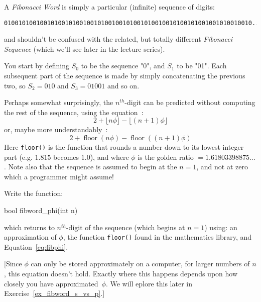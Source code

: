 \label{sec:fibword_phi}


A {\em Fibonacci Word} is simply a particular (infinite) sequence of digits:
\begin{verbatim}
010010100100101001010010010100100101001010010010100101001001010010010...
\end{verbatim}
and shouldn't be confused with the related, but totally different {\em Fibonacci Sequence} (which we'll see later in the lecture series).

You start by defining $S_0$ to be the sequence "0", and $S_1$ to be 
"01". Each subsequent part of the sequence is made by simply concatenating
the previous two, so $S_2 = 010$ and $S_3 = 01001$ and so on.

Perhaps somewhat surprisingly, the $n^{th}$-digit can be
predicted without computing the rest of the sequence, using the equation~:
\begin{equation}
\label{eq:fibphi_math}
2 + \lfloor n \phi \rfloor - \lfloor (n+1) \phi \rfloor
\end{equation}
or, maybe more understandably~:
\begin{equation}
\label{eq:fibphi}
2 + \operatorname{floor}(n \phi) - \operatorname{floor}((n+1) \phi)
\end{equation}
Here \verb^floor()^ is the function that
rounds a number down to its lowest integer part (e.g. $1.815$ becomes
$1.0$), and where $\phi$ is the golden ratio $=1.61803398875...$.
Note also that the sequence is assumed to begin at the $n=1$, and not 
at zero which a programmer might assume!

\begin{exercise}
\label{ex:fibword_phi}
Write the function:
\begin{codesnippet}
bool fibword_phi(int n)
\end{codesnippet}
which returns to $n^{th}$-digit of the sequence (which begins at $n=1$)
using: an approximation of $\phi$, the function \verb^floor()^ found in 
the mathematics library, and Equation~\ref{eq:fibphi}.
\end{exercise}

[Since $\phi$ can only be stored approximately on a computer,
for larger numbers of $n$, this equation doesn't hold. Exactly
where this happens depends upon how closely you have approximated~$\phi$.
We will eplore this later in Exercise~\ref{ex_fibword_s_vs_p}.]
